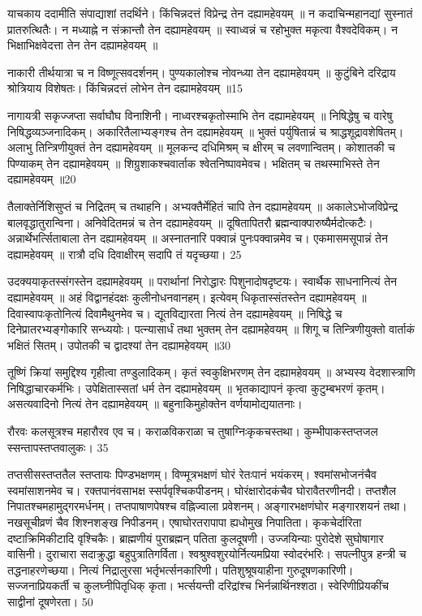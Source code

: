   याचकाय ददामीति संपाद्याशां तदर्थिने।
 किंचिन्नदत्तं विप्रेन्द्र तेन दह्यामहेवयम् ॥ न कदाचिन्महानद्यां सुस्नातं प्रातरुत्थितैः।
 न मध्याह्ने न संक्रान्तौ तेन दह्यामहेवयम् ॥ स्वाध्वन्नं च रहोभुक्त मकृत्वा वैश्वदेविकम्।
 न भिक्षाभिक्षवेदत्ता तेन तेन दह्यामहेवयम् ॥

नाकारी तीर्थयात्रा च न विष्णूत्सवदर्शनम्।
 पुण्यकालोश्च नोवन्ध्या तेन दह्यामहेवयम् ॥ कुटुंबिने दरिद्राय श्रोत्रियाय विशेषतः।
 किंचिन्नदत्तं लोभेन तेन दह्यामहेवयम् ॥15

  नागायत्री सकृज्जप्ता सर्वाघौघ विनाशिनी।
 नाध्वरश्चकृतोस्माभि तेन दह्यामहेवयम् ॥ निषिद्धेषु च वारेषु निषिद्धव्यञ्जनादिकम्।
 अकारितैलाभ्यङ्गश्च तेन दह्यामहेवयम् ॥ भुक्तं पर्युषितान्नं च श्राद्धशूद्रावशेषितम्।
 अलाभु तिन्त्रिणीयुक्तं तेन दह्यामहेवयम् ॥ मूलकन्द दधिमिश्रम् च क्षीरम् च लवणान्वितम्।
 कोशातकी च पिण्याकम् तेन दह्यामहेवयम् ॥ शिग्रुशाकश्चवार्ताक श्वेतनिष्पावमेवच।
 भक्षितम् च तथस्माभिस्ते तेन दह्यामहेवयम् ॥20

  तैलाक्तेर्निशिसुप्तं च निद्रितम् च तथाहनि।
 अभ्यक्तैर्मेहितं चापि तेन दह्यामहेवयम् ॥ अकालेऽभोजविप्रेन्द्र बालवृद्धातुरान्विना।
 अनिवेदितमन्नं च तेन दह्यामहेवयम् ॥ दूषितापितरौ ब्रह्मन्वाक्पारुष्यैर्मदोत्कटैः।
 अन्नार्थेभर्त्सिताबाला तेन दह्यामहेवयम् ॥ अस्नातनारि पक्वान्नं पुनःपक्वान्नमेव च।
 एकमासमसूपान्नं तेन दह्यामहेवयम् ॥
रात्रौ दधि दिवाक्षीरम् सदापि तं यदृच्छया।
25

 उदक्ययाकृतस्संगस्तेन दह्यामहेवयम् ॥ परार्थानां निरोद्धारः पिशुनादोषदृष्टयः।
 स्वार्थैक साधनानित्यं तेन दह्यामहेवयम् ॥ अहं विद्वानहंदक्षः कुलीनोधनवानहम्।
 इत्येवम् धिकृतास्संतस्तेन दह्यामहेवयम् ॥ दिवास्वापःकृतोनित्यं दिवामैथुनमेव च।
 द्यूतविद्यारता नित्यं तेन दह्यामहेवयम् ॥ निषिद्धे च दिनेप्रातरभ्यङ्गोकारि सन्ध्ययोः।
 पत्न्यासार्धं तथा भुक्तम् तेन दह्यामहेवयम् ॥ शिगू च तिन्त्रिणीयुक्तो वार्ताकं भक्षितं सितम्।
 उपोतकी च द्वादश्यां तेन दह्यामहेवयम् ॥30

  तूष्णिं क्रियां समुद्दिश्य गृहीत्वा तण्डुलादिकम्।
 कृतं स्वकुक्षिभरणम् तेन दह्यामहेवयम् ॥ अभ्यस्य वेदशास्त्राणि निषिद्धाचारकर्मभिः।
 उपेक्षितास्सतां धर्म तेन दह्यामहेवयम् ॥ भृतकाद्यापनं कृत्वा कुटुम्बभरणं कृतम्।
 असत्यवादिनो नित्यं तेन दह्यामहेवयम् ॥ बहुनाकिमुहोक्तेन वर्णयामोद्ययातनाः।
 
रौरवः कलसूत्रश्च महारौरव एव च।
 कराळविकराळा च तुषाग्निःकृकचस्तथा।
 कुम्भीपाकस्तप्तजल स्सन्तापस्तप्तवालुकः।
 35

 
तप्तसीसस्तप्ततैल स्तप्तायः पिण्डभक्षणम्।
 विण्मूत्रभक्षणं घोरं रेतःपानं भयंकरम्।
 श्वमांसभोजनंचैव स्वमांसाशनमेव च।
 रक्तपानंवसाभक्ष स्सर्पवृश्चिकपीडनम्।
 घोरंक्षारोदकंचैव घोरावैतरणीनदी।
 तप्तशैल निपातश्चमहामुद्गरमर्धनम्।
 तप्तपाषाणपेषश्च वह्निज्वाला प्रवेशनम्।
 अङ्गारभक्षणंघोर मङ्गारशयनं तथा।
 नखसूचीव्रणं चैव शिश्नशङ्ख निपीडनम्।
 एषाघोरतरापापा ह्यधोमुख निपातिता।
 कृकचेर्दारिता दष्टाक्रिमिकीटादि वृश्चिकैः।
 ब्राह्मणीयं पुराब्रह्मन् पतिता कुलदूषणी।
 उज्जयिन्याः पुरोदेशे सुघोषागार वासिनी।
 दुराचारा सदाक्रुद्धा बहुपुत्रातिगर्विता।
 श्वश्रुश्वशुरयोर्नित्यमप्रिया स्वोदरंभरिः।
 सपत्नीपुत्र हन्त्री च तद्धनाहरणेच्छया।
 नित्यं निद्रालुरसा भर्तृभर्त्सनकारिणी।
 पतिशुश्रूषयाहीना गुरुदूषणकारिणी।
 सज्जनाप्रियकर्ती च कुलघ्नीपितृधिक् कृता।
 भर्त्सयन्ती दरिद्रांश्च भिर्नन्नार्थिनश्शठा।
 स्वेरिणीप्रियकींच साद्वीनां दूषणेरता।
 50

